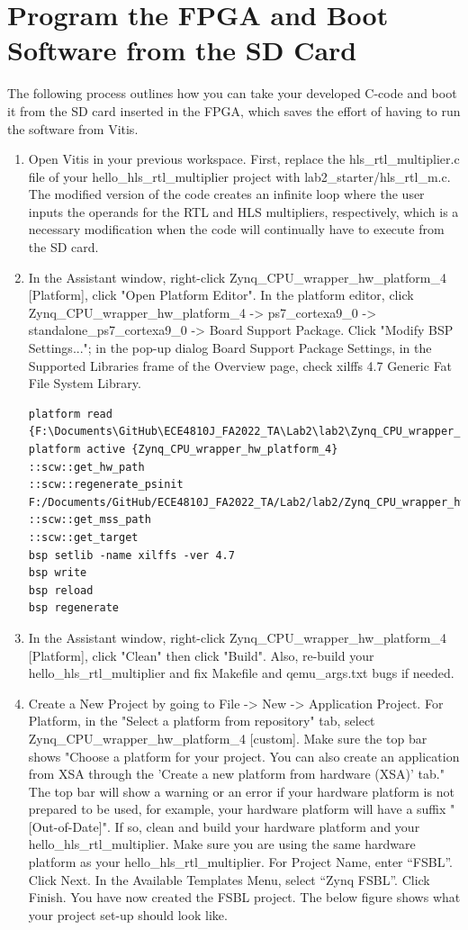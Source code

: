 \documentclass[a4paper,12pt,twoside]{article}
\begin{document}
\section{Program the FPGA and Boot Software from the SD Card}\label{S3}
The following process outlines how you can take your developed C-code and boot it from the SD card inserted in the FPGA, which saves the effort of having to run the software from Vitis.
\begin{enumerate}
    \item Open Vitis in your previous workspace. First, replace the hls\_rtl\_multiplier.c file of your hello\_hls\_rtl\_multiplier project with lab2\_starter/hls\_rtl\_m.c. The modified version of the code creates an infinite loop where the user inputs the operands for the RTL and HLS multipliers, respectively, which is a necessary modification when the code will continually have to execute from the SD card.
    \item In the Assistant window, right-click Zynq\_CPU\_wrapper\_hw\_platform\_4 [Platform], click "Open Platform Editor". In the platform editor, click\\
    Zynq\_CPU\_wrapper\_hw\_platform\_4 -> ps7\_cortexa9\_0 -> standalone\_ps7\_cortexa9\_0 -> Board Support Package. Click "Modify BSP Settings..."; in the pop-up dialog Board Support Package Settings, in the Supported Libraries frame of the Overview page, check xilffs 4.7 Generic Fat File System Library.
    \begin{verbatim}
platform read {F:\Documents\GitHub\ECE4810J_FA2022_TA\Lab2\lab2\Zynq_CPU_wrapper_hw_platform_4\platform.spr}
platform active {Zynq_CPU_wrapper_hw_platform_4}
::scw::get_hw_path
::scw::regenerate_psinit F:/Documents/GitHub/ECE4810J_FA2022_TA/Lab2/lab2/Zynq_CPU_wrapper_hw_platform_4/hw/Zynq_CPU_wrapper_hw_platform_4.xsa
::scw::get_mss_path
::scw::get_target
bsp setlib -name xilffs -ver 4.7
bsp write
bsp reload
bsp regenerate
    \end{verbatim}
    \item In the Assistant window, right-click Zynq\_CPU\_wrapper\_hw\_platform\_4 [Platform], click "Clean" then click "Build". Also, re-build your hello\_hls\_rtl\_multiplier and fix Makefile and qemu\_args.txt bugs if needed.
    \item Create a New Project by going to File -> New -> Application Project. For Platform, in the "Select a platform from repository" tab, select Zynq\_CPU\_wrapper\_hw\_platform\_4 [custom]. Make sure the top bar shows "Choose a platform for your project. You can also create an application from XSA through the 'Create a new platform from hardware (XSA)' tab." The top bar will show a warning or an error if your hardware platform is not prepared to be used, for example, your hardware platform will have a suffix "[Out-of-Date]". If so, clean and build your hardware platform and your  hello\_hls\_rtl\_multiplier. Make sure you are using the same hardware platform as your hello\_hls\_rtl\_multiplier. For Project Name, enter “FSBL”. Click Next. In the Available Templates Menu, select “Zynq FSBL”. Click Finish. You have now created the FSBL project. The below figure shows what your project set-up should look like.

\end{enumerate}
\end{document}

